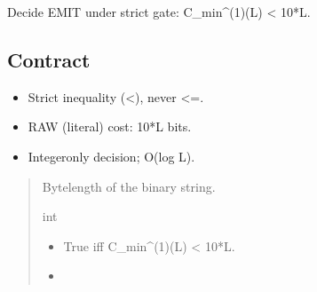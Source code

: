 \documentclass[letterpaper,10pt,english]{sphinxmanual}
\begin{document}

\begin{fulllineitems}
\label{\detokenize{clf_maximal_validator:CLF_MAXIMAL_VALIDATOR_FINAL.should_emit}}
\pysigstartsignatures
\pysiglinewithargsret
{}
{}
{}
\pysigstopsignatures
\sphinxAtStartPar
Decide EMIT under strict gate: C\_min\textasciicircum{}(1)(L) \textless{} 10*L.


\subsection{Contract}
\label{\detokenize{clf_maximal_validator:id2}}\begin{itemize}
\item {} 
\sphinxAtStartPar
Strict inequality (\textless{}), never \textless{}=.

\item {} 
\sphinxAtStartPar
RAW (literal) cost: 10*L bits.

\item {} 
\sphinxAtStartPar
Integer\sphinxhyphen{}only decision; O(log L).

\end{itemize}
\begin{quote}\begin{description}
\sphinxAtStartPar
{}

\sphinxAtStartPar
Byte\sphinxhyphen{}length of the binary string.

\sphinxAtStartPar
int

\sphinxAtStartPar
{}

\begin{itemize}
\item {} 
\sphinxAtStartPar
{} \textendash{} True iff C\_min\textasciicircum{}(1)(L) \textless{} 10*L.

\item {} 
\sphinxAtStartPar
{}


\end{itemize}
\end{description}
\end{quote}
\end{fulllineitems}
\end{document}
